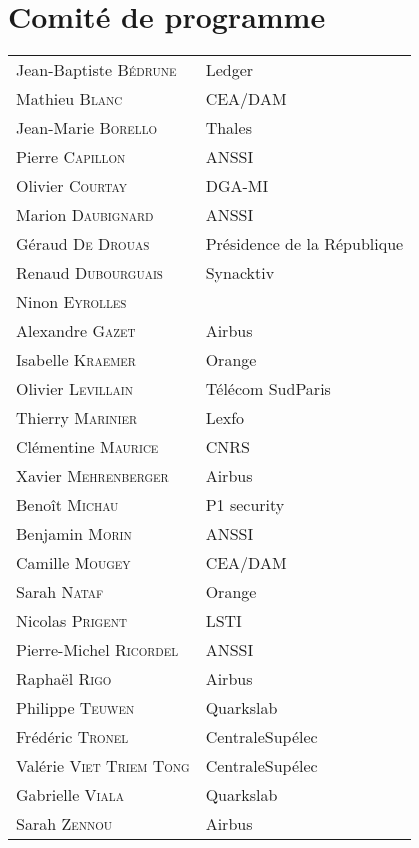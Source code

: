 \section*{Comité de programme}
\begin{tabular}{@{}p{5cm}@{}p{6.5cm}@{}}
  Jean-Baptiste \textsc{Bédrune}  & Ledger              \\
  Mathieu \textsc{Blanc}          & CEA/DAM             \\
  Jean-Marie \textsc{Borello}     & Thales              \\
  Pierre   \textsc{Capillon}      & ANSSI               \\
  Olivier \textsc{Courtay}        & DGA-MI              \\
  Marion \textsc{Daubignard}      & ANSSI               \\
  Géraud \textsc{De Drouas}       & Présidence de la République \\
  Renaud \textsc{Dubourguais}     & Synacktiv           \\
  Ninon \textsc{Eyrolles}         &                     \\
  Alexandre \textsc{Gazet}        & Airbus              \\
  Isabelle \textsc{Kraemer}       & Orange              \\
  Olivier  \textsc{Levillain}     & Télécom SudParis    \\
  Thierry \textsc{Marinier}       & Lexfo               \\
  Clémentine \textsc{Maurice}     & CNRS                \\
  Xavier \textsc{Mehrenberger}    & Airbus              \\
  Benoît \textsc{Michau}         & P1 security          \\
  Benjamin \textsc{Morin}         & ANSSI               \\
  Camille \textsc{Mougey}         & CEA/DAM             \\
  Sarah \textsc{Nataf}            & Orange              \\
  Nicolas \textsc{Prigent}        & LSTI                \\
  Pierre-Michel \textsc{Ricordel} & ANSSI               \\
  Raphaël \textsc{Rigo}           & Airbus              \\
  Philippe \textsc{Teuwen}        & Quarkslab           \\
  Frédéric \textsc{Tronel}        & CentraleSupélec     \\
  Valérie \textsc{Viet Triem Tong}& CentraleSupélec     \\
  Gabrielle \textsc{Viala}        & Quarkslab           \\
  Sarah \textsc{Zennou}           & Airbus              \\
\end{tabular}
